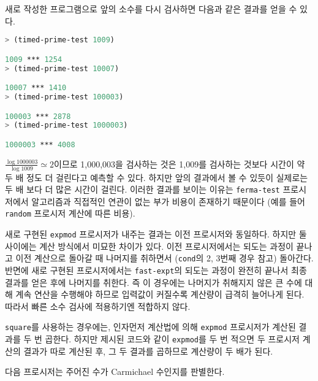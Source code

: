 
새로 작성한 프로그램으로 앞의 소수를 다시 검사하면 다음과 같은 결과를 얻을 수
있다.
\begin{lstlisting}[language=Scheme]
> (timed-prime-test 1009)

1009 *** 1254
> (timed-prime-test 10007)

10007 *** 1410
> (timed-prime-test 100003)

100003 *** 2878
> (timed-prime-test 1000003)

1000003 *** 4008
\end{lstlisting}

$\frac{\log{1000003}}{\log{1009}} \simeq 2$이므로 1,000,003을 검사하는 것은
1,009를 검사하는 것보다 시간이 약 두 배 정도 더 걸린다고 예측할 수 있다. 하지만
앞의 결과에서 볼 수 있듯이 실제로는 두 배 보다 더 많은 시간이 걸린다. 이러한
결과를 보이는 이유는 \texttt{ferma-test} 프로시저에서 알고리즘과 직접적인
연관이 없는 부가 비용이 존재하기 때문이다 (예를 들어
\texttt{random} 프로시저 계산에 따른 비용).


새로 구현된 \texttt{expmod} 프로시저가 내주는 결과는 이전 프로시저와
동일하다. 하지만 둘 사이에는 계산 방식에서 미묘한 차이가 있다. 이전
프로시저에서는 되도는 과정이 끝나고 이전 계산으로 돌아갈 때 나머지를
취하면서 (\texttt{cond}의 2, 3번째 경우 참고) 돌아간다. 반면에 새로 구현된
프로시저에서는 \texttt{fast-expt}의 되도는 과정이 완전히 끝나서 최종 결과를
얻은 후에 나머지를 취한다. 즉 이 경우에는 나머지가 취해지지 않은 큰 수에
대해 계속 연산을 수행해야 하므로 입력값이 커질수록 계산량이 급격히 늘어나게
된다. 따라서 빠른 소수 검사에 적용하기엔 적합하지 않다.


\texttt{square}를 사용하는 경우에는, 인자먼저 계산법에 의해 \texttt{expmod}
프로시저가 계산된 결과를 두 번 곱한다. 하지만 제시된 코드와 같이
\texttt{expmod}를 두 번 적으면 두 프로시저 계산의 결과가 따로 계산된 후, 그 두
결과를 곱하므로 계산량이 두 배가 된다.


다음 프로시저는 주어진 수가 Carmichael 수인지를 판별한다.


